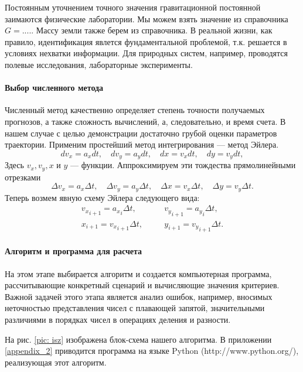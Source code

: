 \documentclass[12pt, openany, twoside]{book} %
\begin{document}
Постоянным уточнением точного значения гравитационной постоянной заимаются физические лаборатории. Мы можем взять значение из справочника $G=....$. Массу земли также берем из справочника. В реальной жизни, как правило, идентификация явлется фундаментальной проблемой, т.к. решается в условиях нехватки информации. Для природных систем, например, проводятся полевые исследования, лабораторные эксперименты.

\paragraph{Выбор численного метода} Численный метод качественно определяет степень точности получаемых прогнозов, а также сложность вычислений, а, следовательно, и время счета. В нашем случае с целью демонстрации достаточно грубой оценки параметров траектории. Применим простейший метод интегрирования --- метод Эйлера.
\begin{equation}
dv_x=a_xdt, \quad dv_y=a_ydt, \quad dx=v_xdt, \quad dy=v_ydt,
\nonumber
\end{equation}
Здесь $v_x, v_y, x$ и $y$ --- функции. Аппроксимируем эти тождества прямолинейными отрезками
\begin{equation}
\Delta v_x=a_x\Delta t, \quad \Delta v_y=a_y \Delta t, \quad \Delta x=v_x\Delta t, \quad \Delta y=v_y\Delta t.
\end{equation}
 Теперь возмем явную схему Эйлера следующего вида:
\begin{eqnarray}
{v_x}_{i+1} = {a_x}_i\Delta t, & \quad & {v_y}_{i+1} = {a_y}_i\Delta t, \\
{x}_{i+1} = {v_x}_{i+1}\Delta t, & \quad & {y}_{i+1} = {v_y}_{i+1}\Delta t.
\end{eqnarray}

\paragraph{Алгоритм и программа для расчета} На этом этапе выбирается алгоритм и создается компьютерная программа, рассчитывающие конкретный сценарий и вычисляющие значения критериев. Важной задачей этого этапа является анализ ошибок, например, вносимых неточностью представления чисел с плавающей запятой, значительными различиями в порядках чисел в операциях деления и разности.

На рис. \ref{pic: isz} изображена блок-схема нашего алгоритма. В приложении \ref{appendix_2} приводится программа на языке Python (http://www.python.org/), реализующая этот алгоритм.
\end{document}
